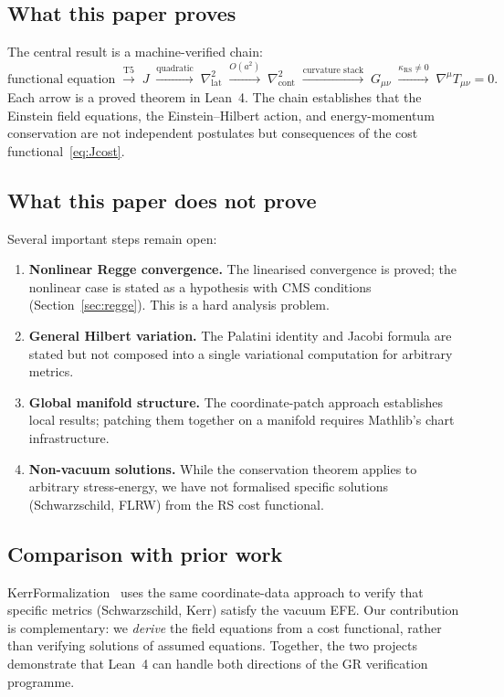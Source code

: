 \documentclass[11pt,a4paper]{article}
\newcommand{\kRS}{\kappa_{\mathrm{RS}}}
\newcommand{\Jcost}{J}
\begin{document}
\subsection{What this paper proves}

The central result is a machine-verified chain:
\[
\text{functional equation} \;\xrightarrow{\text{T5}}\; \Jcost \;\xrightarrow{\text{quadratic}}\; \nabla^2_{\mathrm{lat}} \;\xrightarrow{O(a^2)}\; \nabla^2_{\mathrm{cont}} \;\xrightarrow{\text{curvature stack}}\; G_{\mu\nu} \;\xrightarrow{\kRS \ne 0}\; \nabla^\mu T_{\mu\nu} = 0.
\]
Each arrow is a proved theorem in Lean~4.
The chain establishes that the Einstein field equations, the Einstein--Hilbert action, and energy-momentum conservation are not independent postulates but consequences of the cost functional~\eqref{eq:Jcost}.

\subsection{What this paper does not prove}

Several important steps remain open:

\begin{enumerate}
\item \textbf{Nonlinear Regge convergence.}  The linearised convergence is proved; the nonlinear case is stated as a hypothesis with CMS conditions (Section~\ref{sec:regge}).
This is a hard analysis problem.
\item \textbf{General Hilbert variation.}  The Palatini identity and Jacobi formula are stated but not composed into a single variational computation for arbitrary metrics.
\item \textbf{Global manifold structure.}  The coordinate-patch approach establishes local results; patching them together on a manifold requires Mathlib's chart infrastructure.
\item \textbf{Non-vacuum solutions.}  While the conservation theorem applies to arbitrary stress-energy, we have not formalised specific solutions (Schwarzschild, FLRW) from the RS cost functional.
\end{enumerate}

\subsection{Comparison with prior work}

KerrFormalization~\cite{Iqbal2026} uses the same coordinate-data approach to verify that specific metrics (Schwarzschild, Kerr) satisfy the vacuum EFE.
Our contribution is complementary: we \emph{derive} the field equations from a cost functional, rather than verifying solutions of assumed equations.
Together, the two projects demonstrate that Lean~4 can handle both directions of the GR verification programme.
\end{document}
